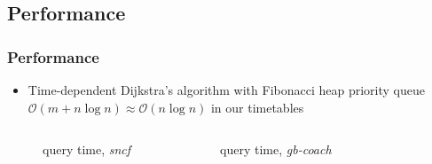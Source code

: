 \documentclass[]{beamer}
\newcommand{\inputTikZ}[1]{%
  }
\newcommand{\inputTikZ}[1]{%
    \beginpgfgraphicnamed{#1-external}%
    \endpgfgraphicnamed%
  }
\begin{document}
        \subsection{Performance}
        \begin{frame}
            \frametitle{Performance}
            \begin{itemize}
            	\item Time-dependent Dijkstra's algorithm with Fibonacci heap priority queue $\mathcal{O}(m + n \log n) \approx \mathcal{O}(n \log n)$ in our timetables
            \end{itemize}
			\begin{columns}[c]
            \column{2.4in}
				\begin{figure}[h]
					\scriptsize
	                \begin{center}
	                    \inputTikZ{./tikzpics/plot_usporall_sncf_size}
	                \end{center}
	                \caption{\footnotesize query time, \textit{sncf}}
	            \end{figure}
	        \column{2.4in}
	        	\begin{figure}[h]
					\scriptsize
	                \begin{center}
	                    \inputTikZ{./tikzpics/plot_usporall_gbcoach_size}
	                \end{center}
	                \caption{\footnotesize query time, \textit{gb-coach}}
	            \end{figure}
	        \end{columns}
        \end{frame}
        
        
\end{document}

